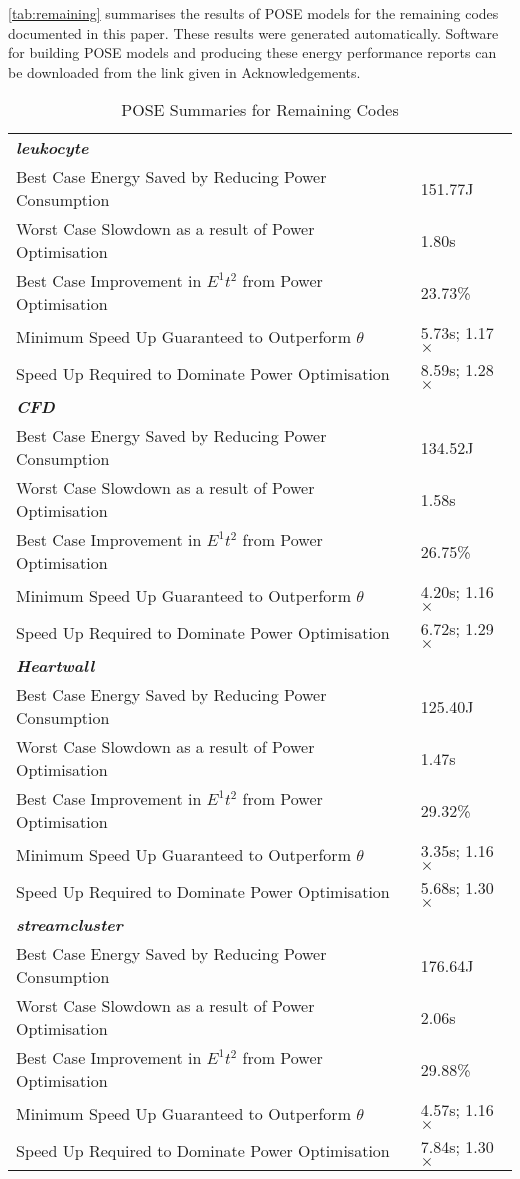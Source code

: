 \label{sec:appendix}
\autoref{tab:remaining} summarises the results of POSE models for the remaining codes documented in this paper.
These results were generated automatically.
Software for building POSE models and producing these energy performance reports can be downloaded from the link given in Acknowledgements.

\begin{table}[h!]
\caption{POSE Summaries for Remaining Codes}
\label{tab:remaining}
\begin{tabular}{@{}ll@{}}\toprule
 \textbf{\emph{leukocyte}}&\\
 Best Case Energy Saved by Reducing Power Consumption & 151.77J \\
 Worst Case Slowdown as a result of Power Optimisation & 1.80s \\
 Best Case Improvement in $E^1t^2$ from Power Optimisation & 23.73\% \\
 Minimum Speed Up Guaranteed to Outperform $\theta$ & 5.73s; 1.17$\times$ \\
 Speed Up Required to Dominate Power Optimisation & 8.59s; 1.28$\times$ \\
 \textbf{\textit{CFD}}& \\
 Best Case Energy Saved by Reducing Power Consumption & 134.52J \\
 Worst Case Slowdown as a result of Power Optimisation & 1.58s \\
 Best Case Improvement in $E^1t^2$ from Power Optimisation & 26.75\% \\
 Minimum Speed Up Guaranteed to Outperform $\theta$ & 4.20s; 1.16$\times$ \\
 Speed Up Required to Dominate Power Optimisation & 6.72s; 1.29$\times$ \\
 \textbf{\textit{Heartwall}}&\\
 Best Case Energy Saved by Reducing Power Consumption & 125.40J \\
 Worst Case Slowdown as a result of Power Optimisation & 1.47s \\
 Best Case Improvement in $E^1t^2$ from Power Optimisation & 29.32\% \\
 Minimum Speed Up Guaranteed to Outperform $\theta$ & 3.35s; 1.16$\times$ \\
 Speed Up Required to Dominate Power Optimisation & 5.68s; 1.30$\times$ \\
 \textbf{\textit{streamcluster}}&\\
 Best Case Energy Saved by Reducing Power Consumption & 176.64J \\
 Worst Case Slowdown as a result of Power Optimisation & 2.06s \\
 Best Case Improvement in $E^1t^2$ from Power Optimisation & 29.88\% \\
 Minimum Speed Up Guaranteed to Outperform $\theta$ & 4.57s; 1.16$\times$ \\
 Speed Up Required to Dominate Power Optimisation & 7.84s; 1.30$\times$ \\
\bottomrule
\end{tabular}
\end{table}
